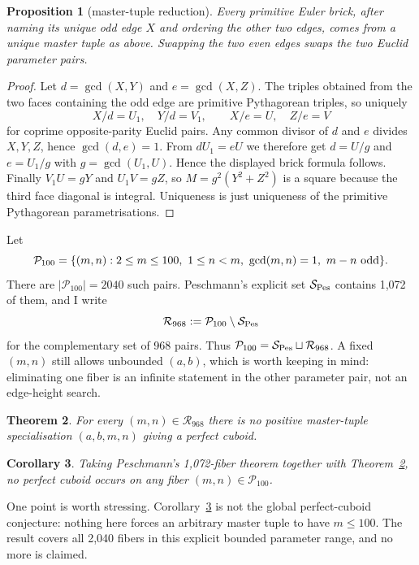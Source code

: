 \documentclass[11pt,a4paper]{amsart}
\newtheorem{theorem}{Theorem}
\newtheorem{proposition}[theorem]{Proposition}
\newtheorem{corollary}[theorem]{Corollary}
\begin{document}
\begin{proposition}[master-tuple reduction]
Every primitive Euler brick, after naming its unique odd edge $X$ and ordering the other two edges, comes from a unique master tuple as above. Swapping the two even edges swaps the two Euclid parameter pairs.
\end{proposition}

\begin{proof}
Let $d=\gcd(X,Y)$ and $e=\gcd(X,Z)$. The triples obtained from the two faces containing the odd edge are primitive Pythagorean triples, so uniquely
\[
X/d=U_1,\quad Y/d=V_1,\qquad X/e=U,\quad Z/e=V
\]
for coprime opposite-parity Euclid pairs. Any common divisor of $d$ and $e$ divides $X,Y,Z$, hence $\gcd(d,e)=1$. From $dU_1=eU$ we therefore get $d=U/g$ and $e=U_1/g$ with $g=\gcd(U_1,U)$. Hence the displayed brick formula follows. Finally $V_1U=gY$ and $U_1V=gZ$, so $M=g^2(Y^2+Z^2)$ is a square because the third face diagonal is integral. Uniqueness is just uniqueness of the primitive Pythagorean parametrisations.
\end{proof}

Let
\[
\mathcal P_{100}=\{(m,n):2\le m\le100,\ 1\le n<m,\ \gcd(m,n)=1,\ m-n\ {\rm odd}\}.
\]
There are $|\mathcal P_{100}|=2040$ such pairs. Peschmann's explicit set $\mathcal S_{\rm Pes}$ contains 1,072 of them, and I write
\[
\mathcal R_{968}:=\mathcal P_{100}\setminus\mathcal S_{\rm Pes}
\]
for the complementary set of 968 pairs. Thus $\mathcal P_{100}=\mathcal S_{\rm Pes}\sqcup\mathcal R_{968}$. A fixed $(m,n)$ still allows unbounded $(a,b)$, which is worth keeping in mind: eliminating one fiber is an infinite statement in the other parameter pair, not an edge-height search.

\begin{theorem}\label{thm:main}
For every $(m,n)\in\mathcal R_{968}$ there is no positive master-tuple specialisation $(a,b,m,n)$ giving a perfect cuboid.
\end{theorem}

\begin{corollary}\label{cor:2040}
Taking Peschmann's 1,072-fiber theorem \cite{Pes1072} together with Theorem~\ref{thm:main}, no perfect cuboid occurs on any fiber $(m,n)\in\mathcal P_{100}$.
\end{corollary}

One point is worth stressing. Corollary~\ref{cor:2040} is not the global perfect-cuboid conjecture: nothing here forces an arbitrary master tuple to have $m\le100$. The result covers all 2,040 fibers in this explicit bounded parameter range, and no more is claimed.
\end{document}
